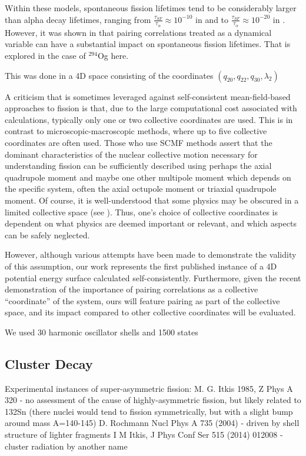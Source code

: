 Within these models, spontaneous fission lifetimes tend to be considerably larger than alpha decay lifetimes, ranging from $\frac{\tau_{SF}}{\tau_{\alpha}}\approx10^{-10}$ in \cite{Baran2015} and \cite{Reinhard2017} to $\frac{\tau_{SF}}{\tau_{\alpha}}\approx10^{-20}$ in \cite{Warda2012}. However, it was shown in \cite{Sadhukhan2014} that pairing correlations treated as a dynamical variable can have a substantial impact on spontaneous fission lifetimes. That is explored in the case of $^{294}$Og here.

This was done in a 4D space consisting of the coordinates $(q_{20}, q_{22}, q_{30}, \lambda_2)$

A criticism that is sometimes leveraged against self-consistent mean-field-based approaches to fission is that, due to the large computational cost associated with calculations, typically only one or two collective coordinates are used. This is in contrast to microscopic-macroscopic methods, where up to five collective coordinates are often used. Those who use SCMF methods assert that the dominant characteristics of the nuclear collective motion necessary for understanding fission can be sufficiently described using perhaps the axial quadrupole moment and maybe one other multipole moment which depends on the specific system, often the axial octupole moment or triaxial quadrupole moment. Of course, it is well-understood that some physics may be obscured in a limited collective space (see \cite{Dubray2012}). Thus, one's choice of collective coordinates is dependent on what physics are deemed important or relevant, and which aspects can be safely neglected.

However, although various attempts have been made to demonstrate the validity of this assumption, our work represents the first published instance of a 4D potential energy surface calculated self-consistently. Furthermore, given the recent demonstration of the importance of pairing correlations as a collective ``coordinate'' of the system, ours will feature pairing as part of the collective space, and its impact compared to other collective coordinates will be evaluated.

We used 30 harmonic oscillator shells and 1500 states

\subsection{Cluster Decay}

Experimental instances of super-asymmetric fission:
M. G. Itkis 1985, Z Phys A 320 - no assessment of the cause of highly-asymmetric fission, but likely related to 132Sn (there nuclei would tend to fission symmetrically, but with a slight bump around mass A=140-145)
D. Rochmann Nucl Phys A 735 (2004) - driven by shell structure of lighter fragments
I M Itkis, J Phys Conf Ser 515 (2014) 012008 - cluster radiation by another name

